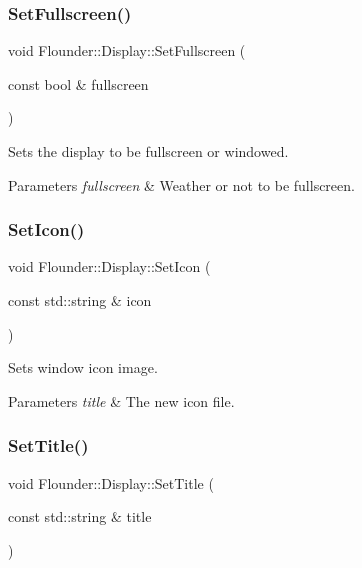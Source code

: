 \subsubsection{\texorpdfstring{Set\+Fullscreen()}{SetFullscreen()}}
{\footnotesize\ttfamily void Flounder\+::\+Display\+::\+Set\+Fullscreen (\begin{DoxyParamCaption}\item[{const bool \&}]{fullscreen }\end{DoxyParamCaption})}



Sets the display to be fullscreen or windowed. 


\begin{DoxyParams}{Parameters}
{\em fullscreen} & Weather or not to be fullscreen. \\
\hline
\end{DoxyParams}
\mbox{\label{class_flounder_1_1_display_a533657ade23681f0e21643d5e4b9ce81}} 
\subsubsection{\texorpdfstring{Set\+Icon()}{SetIcon()}}
{\footnotesize\ttfamily void Flounder\+::\+Display\+::\+Set\+Icon (\begin{DoxyParamCaption}\item[{const std\+::string \&}]{icon }\end{DoxyParamCaption})}



Sets window icon image. 


\begin{DoxyParams}{Parameters}
{\em title} & The new icon file. \\
\hline
\end{DoxyParams}
\mbox{\label{class_flounder_1_1_display_a38d8c2feda74aa6a46900ba2ee845703}} 
\subsubsection{\texorpdfstring{Set\+Title()}{SetTitle()}}
{\footnotesize\ttfamily void Flounder\+::\+Display\+::\+Set\+Title (\begin{DoxyParamCaption}\item[{const std\+::string \&}]{title }\end{DoxyParamCaption})}



